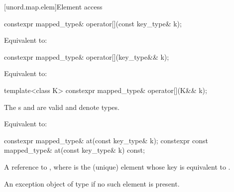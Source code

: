 [unord.map.elem]{Element access}

%
%
\begin{itemdecl}
constexpr mapped_type& operator[](const key_type& k);
\end{itemdecl}

\begin{itemdescr}
\pnum
\effects
Equivalent to: 
\end{itemdescr}

%
%
\begin{itemdecl}
constexpr mapped_type& operator[](key_type&& k);
\end{itemdecl}

\begin{itemdescr}
\pnum
\effects
Equivalent to: 
\end{itemdescr}

%
%
\begin{itemdecl}
template<class K> constexpr mapped_type& operator[](K&& k);
\end{itemdecl}

\begin{itemdescr}
\pnum
\constraints
The s  and
 are valid and denote types.

\pnum
\effects
Equivalent to: 
\end{itemdescr}

%
%
\begin{itemdecl}
constexpr mapped_type& at(const key_type& k);
constexpr const mapped_type& at(const key_type& k) const;
\end{itemdecl}

\begin{itemdescr}
\pnum
\returns
A reference to , where  is the (unique) element whose key is equivalent to .

\pnum
\throws
An exception object of type  if no such element is present.
\end{itemdescr}

